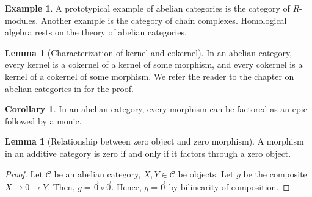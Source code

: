 \documentclass[10pt]{amsart}
\newcommand{\8}{\ensuremath{\infty}}
\newcommand{\0}{\ensuremath{\overset{\rightarrow}{0}}}
\newcommand{\1}{\ensuremath{\mathbf{1}}}
\newcommand{\C}{\ensuremath{\mathscr{C}}}
\theoremstyle{definition}
\newtheorem{lemma}[definition]{Lemma}
\newtheorem{corollary}[definition]{Corollary}
\newtheorem{example}[definition]{Example}
\numberwithin{definition}{subsection}
\numberwithin{definition}{section}
\begin{document}
\begin{example}
  A prototypical example of abelian categories is the category of $R$-modules. Another example is the category of chain complexes. Homological algebra rests on the theory of abelian categories.
\end{example}

\begin{lemma}[Characterization of kernel and cokernel\label{lemma:kercoker}]
  In an abelian category, every kernel is a cokernel of a kernel of some morphism, and every cokernel is a kernel of a cokernel of some morphism. We refer the reader to the chapter on abelian categories in \cite{MacLane13} for the proof.
\end{lemma}

\begin{corollary}
  In an abelian category, every morphism can be factored as an epic followed by a monic.
\end{corollary}

\begin{lemma}[Relationship between zero object and zero morphism]
  A morphism in an additive category is zero if and only if it factors through a zero object.
\end{lemma}

\begin{proof}
  Let $\C$ be an abelian category, $X, Y \in \C$ be objects. Let $g$ be the composite $X \rightarrow 0 \rightarrow Y$. Then, $g = \0 \circ \0$. Hence, $g = \0$ by bilinearity of composition.
\end{proof}
\end{document}
